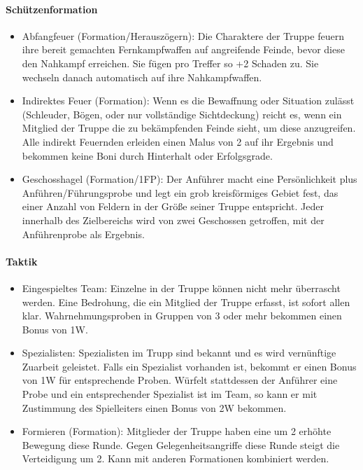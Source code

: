 \documentclass{article}
\begin{document}
\paragraph{Schützenformation}

\begin{itemize}
\item Abfangfeuer (Formation/Herauszögern): Die Charaktere der Truppe feuern ihre bereit gemachten Fernkampfwaffen auf angreifende Feinde, bevor diese den Nahkampf erreichen. Sie fügen pro Treffer so +2 Schaden zu. Sie wechseln danach automatisch auf ihre Nahkampfwaffen.
\item Indirektes Feuer (Formation): Wenn es die Bewaffnung oder Situation zulässt (Schleuder, Bögen, oder nur vollständige Sichtdeckung) reicht es, wenn ein Mitglied der Truppe die zu bekämpfenden Feinde sieht, um diese anzugreifen. Alle indirekt Feuernden erleiden einen Malus von 2 auf ihr Ergebnis und bekommen keine Boni durch Hinterhalt oder Erfolgsgrade.
\item Geschosshagel (Formation/1FP): Der Anführer macht eine Persönlichkeit plus Anführen/Führungsprobe und legt ein grob kreisförmiges Gebiet fest, das einer Anzahl von Feldern in der Größe seiner Truppe entspricht. Jeder innerhalb des Zielbereichs wird von zwei Geschossen getroffen, mit der Anführenprobe als Ergebnis.
\end{itemize}

\paragraph{Taktik}

\begin{itemize}
\item Eingespieltes Team: Einzelne in der Truppe können nicht mehr überrascht werden. Eine Bedrohung, die ein Mitglied der Truppe erfasst, ist sofort allen klar. Wahrnehmungsproben in Gruppen von 3 oder mehr bekommen einen Bonus von 1W.
\item Spezialisten: Spezialisten im Trupp sind bekannt und es wird vernünftige Zuarbeit geleistet. Falls ein Spezialist vorhanden ist, bekommt er einen Bonus von 1W für entsprechende Proben. Würfelt stattdessen der Anführer eine Probe und ein entsprechender Spezialist ist im Team, so kann er mit Zustimmung des Spielleiters einen Bonus von 2W bekommen.
\item Formieren (Formation): Mitglieder der Truppe haben eine um 2 erhöhte Bewegung diese Runde. Gegen Gelegenheitsangriffe diese Runde steigt die Verteidigung um 2. Kann mit anderen Formationen kombiniert werden.
\end{itemize}
\end{document}
